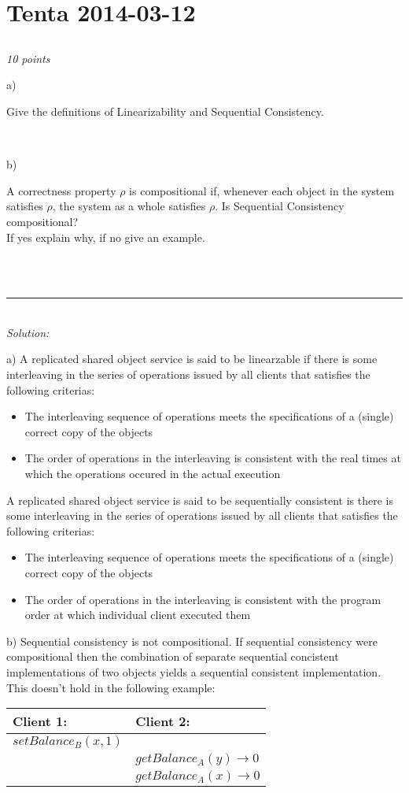 \documentclass[a4paper]{article}
\newcommand{\horrule}[1]{\rule{\linewidth}{#1}} %
\newcommand{\points}[1]{\subsection{} \textit{#1 points}\\}
\newcommand{\question}[2][]{
  \noindent
  \parbox[t]{\textwidth}{#1 \parbox[t]{0.95\textwidth}{#2}}\\
}
\newcommand{\solution}[1]{\\\horrule{0.5pt}\\[3pt]\textit{Solution: }\\[0.1cm]\begin{minipage}{\textwidth}#1\end{minipage}}
\newcommand{\highlight}[1]{{\color{blue}#1}}
\begin{document}
\section{Tenta 2014-03-12}
\points{10}
\label{2014-03:linearizability}
\question[a)]{
  Give the definitions of Linearizability and Sequential Consistency.
}
\question[b)]{
  A correctness property $\rho$ is compositional if, whenever
  each object in the system satisfies $\rho$, the system as a whole
  satisfies $\rho$. Is Sequential Consistency compositional? \\
  If yes explain why, if no give an example.
}
\solution{
a) A replicated shared object service is said to be \highlight{linearzable} if there is some interleaving in the series of operations issued by all clients that satisfies the following criterias:
\begin{itemize}
  \item{The interleaving sequence of operations meets the specifications of a (single) correct copy of the objects}
  \item{\highlight{The order of operations in the interleaving is consistent with the real times at which the operations occured in the actual execution}}
\end{itemize}
A replicated shared object service is said to be \highlight{sequentially consistent} is there is some interleaving in the series of operations issued by all clients that satisfies the following criterias:
\begin{itemize}
  \item{The interleaving sequence of operations meets the specifications of a (single) correct copy of the objects}
  \item{\highlight{The order of operations in the interleaving is consistent with the program order at which individual client executed them}}
\end{itemize}
b) Sequential consistency is not compositional. If sequential consistency were compositional then the combination of separate sequential concistent implementations of two objects yields a sequential consistent implementation. This doesn't hold in the following example:
  \begin{center}
    \begin{tabular}{| l | l |}\hline
      Client 1: & Client 2: \\\hline
      $setBalance_B(x, 1)$ &\\
      & $getBalance_A(y) \rightarrow 0$\\
      & $getBalance_A(x) \rightarrow 0$\\

\end{tabular}
\end{center}}
\end{document}
